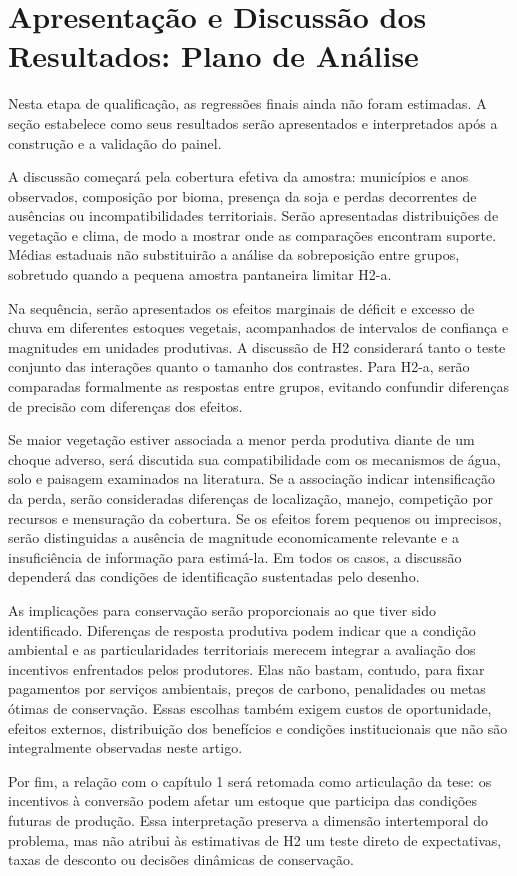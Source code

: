 \section{Apresentação e Discussão dos Resultados: Plano de Análise}

Nesta etapa de qualificação, as regressões finais ainda não foram estimadas. A seção estabelece como seus resultados serão apresentados e interpretados após a construção e a validação do painel.

A discussão começará pela cobertura efetiva da amostra: municípios e anos observados, composição por bioma, presença da soja e perdas decorrentes de ausências ou incompatibilidades territoriais. Serão apresentadas distribuições de vegetação e clima, de modo a mostrar onde as comparações encontram suporte. Médias estaduais não substituirão a análise da sobreposição entre grupos, sobretudo quando a pequena amostra pantaneira limitar H2-a.

Na sequência, serão apresentados os efeitos marginais de déficit e excesso de chuva em diferentes estoques vegetais, acompanhados de intervalos de confiança e magnitudes em unidades produtivas. A discussão de H2 considerará tanto o teste conjunto das interações quanto o tamanho dos contrastes. Para H2-a, serão comparadas formalmente as respostas entre grupos, evitando confundir diferenças de precisão com diferenças dos efeitos.

Se maior vegetação estiver associada a menor perda produtiva diante de um choque adverso, será discutida sua compatibilidade com os mecanismos de água, solo e paisagem examinados na literatura. Se a associação indicar intensificação da perda, serão consideradas diferenças de localização, manejo, competição por recursos e mensuração da cobertura. Se os efeitos forem pequenos ou imprecisos, serão distinguidas a ausência de magnitude economicamente relevante e a insuficiência de informação para estimá-la. Em todos os casos, a discussão dependerá das condições de identificação sustentadas pelo desenho.

As implicações para conservação serão proporcionais ao que tiver sido identificado. Diferenças de resposta produtiva podem indicar que a condição ambiental e as particularidades territoriais merecem integrar a avaliação dos incentivos enfrentados pelos produtores. Elas não bastam, contudo, para fixar pagamentos por serviços ambientais, preços de carbono, penalidades ou metas ótimas de conservação. Essas escolhas também exigem custos de oportunidade, efeitos externos, distribuição dos benefícios e condições institucionais que não são integralmente observadas neste artigo.

Por fim, a relação com o capítulo 1 será retomada como articulação da tese: os incentivos à conversão podem afetar um estoque que participa das condições futuras de produção. Essa interpretação preserva a dimensão intertemporal do problema, mas não atribui às estimativas de H2 um teste direto de expectativas, taxas de desconto ou decisões dinâmicas de conservação.
